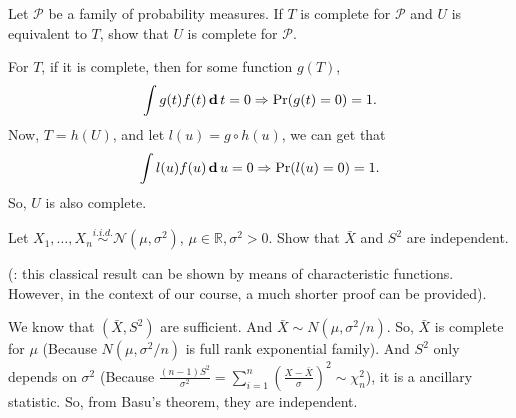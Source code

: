 \begin{exercise}
    Let \(\mathcal{P}\) be a family of probability measures. If \(T\) is complete for \(\mathcal{P}\) and \(U\) is equivalent to \(T\), show that \(U\) is complete for \(\mathcal{P}\). 
\end{exercise}

\begin{solution}
    For $T$, if it is complete, then for some function $g(T)$, 
    \[
        \int g(t)f(t)\,\mathbf{d}\, t=0 \Rightarrow \Pr(g(t)=0)=1. 
    \]
    Now, $T=h(U)$, and let $l(u)=g\circ h(u)$, we can get that 
    \[
        \int l(u)f(u)\,\mathbf{d}\, u=0 \Rightarrow \Pr(l(u)=0)=1. 
    \]
    So, $U$ is also complete. 
\end{solution}

\begin{exercise}
    Let \(X_{1}, \ldots, X_{n} \stackrel{i.i.d. }{\sim} \mathcal{N}\left(\mu, \sigma^{2}\right)\), \(\mu \in \mathbb{R}, \sigma^{2}>0 .\) Show that \(\bar{X}\) and \(S^{2}\) are independent. 
    
    (: this classical result can be shown by means of characteristic functions. However, in the context of our course, a much shorter proof can be provided). 
\end{exercise}

\begin{solution}
    We know that $(\bar{X}, S^2)$ are sufficient. And $\bar{X}\sim N(\mu,\sigma^2/n)$. So, $\bar{X}$ is complete for $\mu$ (Because $N(\mu,\sigma^2/n)$ is full rank exponential family). And $S^2$ only depends on $\sigma^2$ (Because $\frac{(n-1)S^2}{\sigma^2}=\sum_{i=1}^n(\frac{X-\bar{X}}{\sigma})^2\sim\chi_n^2$), it is a ancillary statistic. So, from Basu's theorem, they are independent. 
\end{solution}


